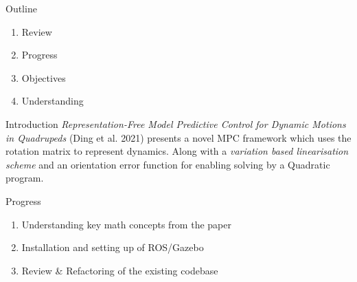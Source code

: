 \documentclass{beamer}
\begin{document}
\begin{frame}\titlepage\end{frame}\normalfont


\begin{frame}{Outline}
	\begin{enumerate}
            \item Review
		\item Progress
            \item Objectives
            \item Understanding
	\end{enumerate}
\end{frame}\normalfont
\begin{frame}{Introduction}
        \textit{Representation-Free Model Predictive Control for  Dynamic Motions in Quadrupeds} (Ding et al. 2021) presents a novel MPC framework which uses the rotation matrix to represent dynamics. Along with a \textit{variation based linearisation scheme} and an orientation error function for enabling solving by a Quadratic program.
\end{frame}\normalfont 
\begin{frame}{Progress}
        \begin{enumerate}
            \item{Understanding key math concepts from the paper}
            \item{Installation and setting up of ROS/Gazebo}
            \item{Review \& Refactoring of the existing codebase}
        \end{enumerate}
\end{frame}\normalfont
\end{document}
